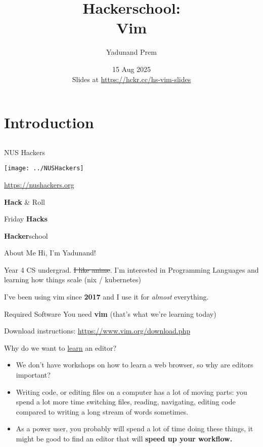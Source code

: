 \documentclass[12pt]{beamer}
\title{Hackerschool: \\Vim}
\author{Yadunand Prem}
\date{15 Aug 2025 \\ Slides at \url{https://hckr.cc/hs-vim-slides}}
\begin{document}
\frame[plain]{\titlepage}

\section{Introduction}
\subsection{}

\begin{frame}{NUS Hackers}

    \begin{center}
        \texttt{[image: ../NUSHackers]}

        \url{https://nushackers.org}
    \end{center}

    \begin{center}
        \textbf{Hack} \& Roll

        Friday \textbf{Hacks}

        \textbf{Hacker}school
    \end{center}

\end{frame}

\begin{frame}{About Me}
    Hi, I'm Yadunand!

    Year 4 CS undergrad. \sout{I like anime}. I'm interested in Programming Languages and learning how things scale (nix / kubernetes)

    I've been using vim since \textbf{2017} and I use it for \textit{almost} everything.
\end{frame}

\begin{frame}{Required Software}
    You need \textbf{vim} (that's what we're learning today)

    Download instructions: \url{https://www.vim.org/download.php}
\end{frame}

\begin{frame}{Why do we want to \underline{learn} an editor?}
    \begin{itemize}
        \item We don't have workshops on how to learn a web browser, so why are editors important?
        \item Writing code, or editing files on a computer has a lot of moving parts: you spend a lot more time switching files, reading, navigating, editing code compared to writing a long stream of words sometimes.
        \item As a power user, you probably will spend a lot of time doing these things, it might be good to find an editor that will \textbf{speed up your workflow.}
    \end{itemize}
\end{frame}
\end{document}
